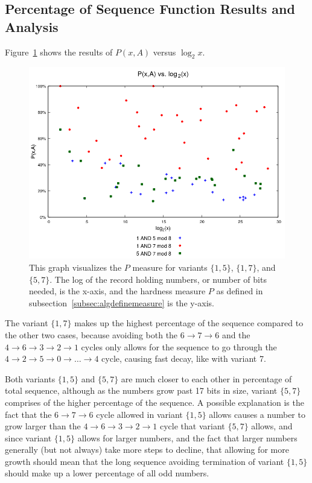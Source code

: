 \subsection{Percentage of Sequence Function Results and Analysis} \label{subsubsec:algmulpercentage}
Figure~\ref{fig:p_multi_vslog} shows the results of $P(x,A)$ versus $\log_2{x}$.\par
\begin{figure}
    \centering
    \includegraphics[scale=0.75]{ModAvoidanceAnalysisPics/P_vs_log_multi_base.png}
    \caption{This graph visualizes the $P$ measure for variants $\{1,5\}$, $\{1,7\}$, and $\{5,7\}$. The log of the record holding numbers, or number of bits needed, is the x-axis, and the hardness measure $P$ as defined in subsection~\ref{subsec:algdefinemeasure} is the y-axis.}
    \label{fig:p_multi_vslog}
\end{figure}
The variant $\{1,7\}$ makes up the highest percentage of the sequence compared to the other two cases, because avoiding both the $6 \rightarrow 7 \rightarrow 6$ and the $4 \rightarrow 6 \rightarrow 3 \rightarrow 2 \rightarrow 1$ cycles only allows for the sequence to go through the $4  \rightarrow 2 \rightarrow 5 \rightarrow 0 \rightarrow \ldots \rightarrow 4$ cycle, causing fast decay, like with variant 7. \par
Both variants $\{1,5\}$ and $\{5,7\}$ are much closer to each other in percentage of total sequence, although as the numbers grow past 17 bits in size, variant $\{5,7\}$ comprises of the higher percentage of the sequence. A possible explanation is the fact that the $6 \rightarrow 7 \rightarrow 6$ cycle allowed in variant $\{1,5\}$ allows causes a number to grow larger than the $4 \rightarrow 6 \rightarrow 3 \rightarrow 2 \rightarrow 1$ cycle that variant $\{5,7\}$ allows, and since variant $\{1,5\}$ allows for larger numbers, and the fact that larger numbers generally (but not always) take more steps to decline, that allowing for more growth should mean that the long sequence avoiding termination of variant $\{1,5\}$ should make up a lower percentage of all odd numbers.
